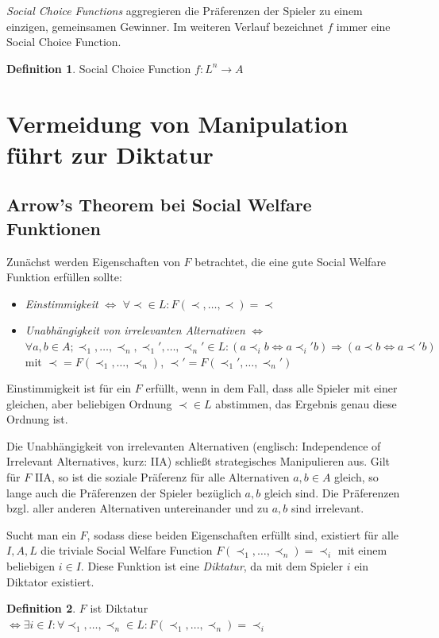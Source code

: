 \documentclass[a4paper,11pt]{article}
\theoremstyle{definition}
\newtheorem{definition}{Definition}
\theoremstyle{plain}
\theoremstyle{definition}
\begin{document}
\emph{Social Choice Functions} aggregieren die Präferenzen der Spieler zu einem einzigen, gemeinsamen Gewinner. Im weiteren Verlauf bezeichnet $f$ immer eine Social Choice Function.
\begin{definition}
	\label{def:socialchoicefunc}
	Social Choice Function $f : L^n \rightarrow A$
\end{definition}

\section{Vermeidung von Manipulation führt zur Diktatur}
\subsection{Arrow's Theorem bei Social Welfare Funktionen}
Zunächst werden Eigenschaften von $F$ betrachtet, die eine gute Social Welfare Funktion erfüllen sollte:
\begin{itemize}
	\item \emph{Einstimmigkeit} $\iff$ $\forall \prec \in L: F(\prec, \ldots,\prec) = \prec$
	\item \emph{Unabhängigkeit von irrelevanten Alternativen}
	$\iff$ $\forall a, b \in A; \prec_1,\ldots,\prec_n, \prec_1', \ldots, \prec_n' \in L:	(a\prec_i b \iff a\prec_i' b) \Rightarrow (a\prec b \iff a\prec' b)$	mit $\prec = F(\prec_1, \ldots, \prec_n)$, $\prec' = F(\prec_1', \ldots, \prec_n')$
\end{itemize}

Einstimmigkeit ist für ein $F$ erfüllt, wenn in dem Fall, dass alle Spieler mit einer gleichen, aber beliebigen Ordnung $\prec \in L$ abstimmen, das Ergebnis genau diese Ordnung ist. 

Die Unabhängigkeit von irrelevanten Alternativen (englisch: Independence of Irrelevant Alternatives, kurz: IIA) schließt strategisches Manipulieren aus. Gilt für $F$ IIA, so ist die soziale Präferenz für alle Alternativen $a, b \in A$ gleich, so lange auch die Präferenzen der Spieler bezüglich $a, b$ gleich sind. Die Präferenzen bzgl. aller anderen Alternativen untereinander und zu $a, b$ sind irrelevant.

Sucht man ein $F$, sodass diese beiden Eigenschaften erfüllt sind, existiert für alle $I, A, L$ die triviale Social Welfare Function $F(\prec_1, \ldots, \prec_n) = \prec_i$ mit einem beliebigen $i \in I$. Diese Funktion ist eine \emph{Diktatur}, da mit dem Spieler $i$ ein Diktator existiert. 

\begin{definition}
	\label{def:diktatur}
	$F$ ist Diktatur$\iff\exists i \in I: \forall \prec_1, \ldots, \prec_n \in L: F(\prec_1, \ldots, \prec_n) = \prec_i$
\end{definition}
\end{document}
